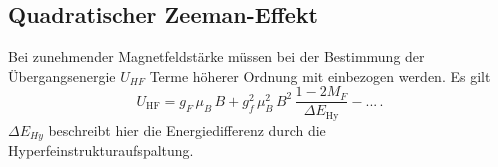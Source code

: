 \subsection{Quadratischer Zeeman-Effekt}
Bei zunehmender Magnetfeldstärke müssen bei der Bestimmung der Übergangsenergie $U_{HF}$ Terme höherer Ordnung mit einbezogen werden. Es gilt
\begin{equation}
  \label{eqn:zeeman^2}
  U_\mathrm{HF} = g_F\,\mu_B\,B + g_f^2\,\mu_B^2\,B^2\,\frac{1-2M_F}{\Delta E_\mathrm{Hy}}-...\, .
\end{equation}
$\Delta E_{Hy}$ beschreibt hier die Energiedifferenz durch die Hyperfeinstrukturaufspaltung.
